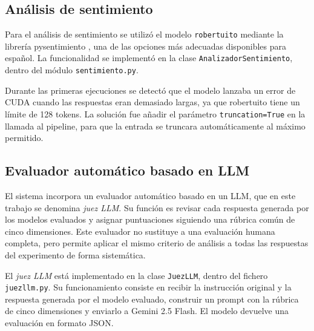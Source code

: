 \documentclass[12pt]{report} %
\renewcommand{\_}{\oldunderscore\allowbreak}
\begin{document}
\subsection{Análisis de sentimiento}

Para el análisis de sentimiento se utilizó el modelo \texttt{robertuito} mediante la librería pysentimiento \cite{perez2021pysentimiento}, una de las opciones más adecuadas disponibles para español. La funcionalidad se implementó en la clase \texttt{AnalizadorSentimiento}, dentro del módulo \texttt{sentimiento.py}.

Durante las primeras ejecuciones se detectó que el modelo lanzaba un error de CUDA cuando las respuestas eran demasiado largas, ya que robertuito tiene un límite de 128 tokens. La solución fue añadir el parámetro \texttt{truncation=True} en la llamada al pipeline, para que la entrada se truncara automáticamente al máximo permitido.

\subsection{Evaluador automático basado en LLM}
\label{sec:juez_llm_prompt}

El sistema incorpora un evaluador automático basado en un LLM, que en este trabajo se denomina \textit{juez LLM}. Su función es revisar cada respuesta generada por los modelos evaluados y asignar puntuaciones siguiendo una rúbrica común de cinco dimensiones. Este evaluador no sustituye a una evaluación humana completa, pero permite aplicar el mismo criterio de análisis a todas las respuestas del experimento de forma sistemática.

El \textit{juez LLM} está implementado en la clase \texttt{JuezLLM}, dentro del fichero \texttt{juez\_llm.py}. Su funcionamiento consiste en recibir la instrucción original y la respuesta generada por el modelo evaluado, construir un prompt con la rúbrica de cinco dimensiones y enviarlo a Gemini 2.5 Flash. El modelo devuelve una evaluación en formato JSON.
\end{document}
